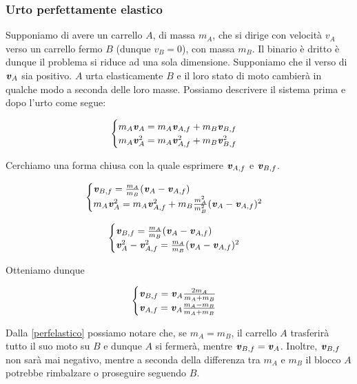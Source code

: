 \subsubsection*{Urto perfettamente elastico}
Supponiamo di avere un carrello $A$, di massa $m_A$, che si dirige con velocità $v_A$
verso un carrello fermo $B$ (dunque $v_B = 0$), con massa $m_B$. Il binario è dritto
è dunque il problema si riduce ad una sola dimensione. Supponiamo
che il verso di $\textbf{\textit{v}}_A$ sia positivo. $A$ urta elasticamente
$B$ e il loro stato di moto cambierà in qualche modo a seconda delle
loro masse. Possiamo descrivere il sistema prima e dopo l'urto come
segue:

\[
\begin{cases}
    m_A\textbf{\textit{v}}_A = m_A\textbf{\textit{v}}_{A,f} + m_B\textbf{\textit{v}}_{B,f}\\
    m_A\textbf{\textit{v}}_A^2 = m_A\textbf{\textit{v}}_{A,f}^2 + m_B\textbf{\textit{v}}_{B,f}^2
\end{cases}
\]

\noindent Cerchiamo una forma chiusa con la quale esprimere $\textbf{\textit{v}}_{A,f}$
e $\textbf{\textit{v}}_{B,f}$.

\[
\begin{cases}
    \textbf{\textit{v}}_{B,f} = \frac{m_A}{m_B}(\textbf{\textit{v}}_A - \textbf{\textit{v}}_{A,f})\\
    m_A\textbf{\textit{v}}_A^2 = m_A\textbf{\textit{v}}_{A,f}^2 + m_B \frac{m_A^2}{m_B^2}(\textbf{\textit{v}}_A - \textbf{\textit{v}}_{A,f})^2
\end{cases}
\]

\[
\begin{cases}
    \textbf{\textit{v}}_{B,f} = \frac{m_A}{m_B}(\textbf{\textit{v}}_A - \textbf{\textit{v}}_{A,f})\\
    \textbf{\textit{v}}_A^2 - \textbf{\textit{v}}_{A,f}^2 = \frac{m_A}{m_B}(\textbf{\textit{v}}_A - \textbf{\textit{v}}_{A,f})^2
\end{cases}
\]

\noindent Otteniamo dunque

\begin{align}
\begin{cases}
    \textbf{\textit{v}}_{B,f} = \textbf{\textit{v}}_A\frac{2m_A}{m_A + m_B}\\
    \textbf{\textit{v}}_{A,f} = \textbf{\textit{v}}_A\frac{m_A - m_B}{m_A + m_B}
\end{cases}\label{perfelastico}
\end{align}

\noindent Dalla \ref{perfelastico} possiamo notare che, se $m_A = m_B$,
il carrello $A$ trasferirà tutto il suo moto su $B$ e dunque $A$ si fermerà,
mentre $\textbf{\textit{v}}_{B,f} = \textbf{\textit{v}}_A$. Inoltre, $\textbf{\textit{v}}_{B,f}$
non sarà mai negativo, mentre a seconda della differenza tra $m_A$ e $m_B$
il blocco $A$ potrebbe rimbalzare o proseguire seguendo $B$.

